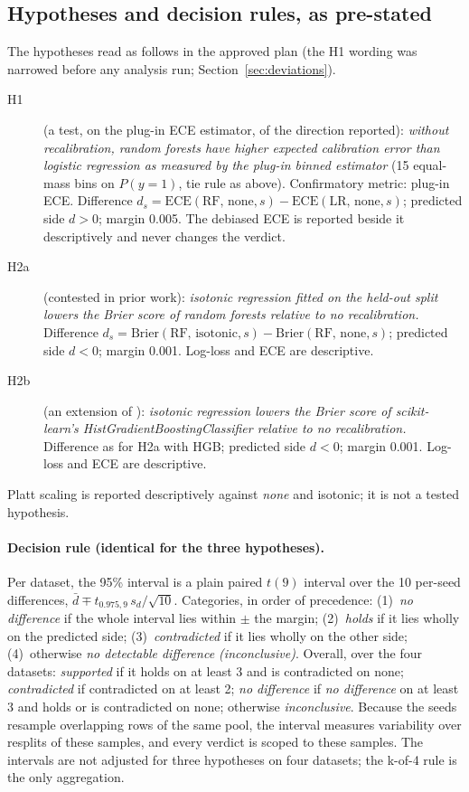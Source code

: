 \documentclass[11pt]{article}
\newcommand{\cat}[1]{\emph{#1}}
\begin{document}
\subsection{Hypotheses and decision rules, as pre-stated}
\label{sec:hyp}

The hypotheses read as follows in the approved plan (the H1 wording was narrowed before any
analysis run; Section~\ref{sec:deviations}).

\begin{description}
  \item[H1] (a test, on the plug-in ECE estimator, of the direction
        \citet{niculescumizil2005} reported): \emph{without recalibration, random forests
        have higher expected calibration error than logistic regression as measured by the
        plug-in binned estimator} (15 equal-mass bins on $P(y=1)$, tie rule as above).
        Confirmatory metric: plug-in ECE. Difference $d_s=\mathrm{ECE}(\text{RF, none},
        s)-\mathrm{ECE}(\text{LR, none}, s)$; predicted side $d>0$; margin 0.005. The debiased
        ECE is reported beside it descriptively and never changes the verdict.
  \item[H2a] (contested in prior work): \emph{isotonic regression fitted on the held-out
        split lowers the Brier score of random forests relative to no recalibration.}
        Difference $d_s=\mathrm{Brier}(\text{RF, isotonic}, s)-\mathrm{Brier}(\text{RF,
        none}, s)$; predicted side $d<0$; margin 0.001. Log-loss and ECE are descriptive.
  \item[H2b] (an extension of \citealp{fonseca2017}): \emph{isotonic regression lowers the
        Brier score of scikit-learn's HistGradientBoostingClassifier relative to no
        recalibration.} Difference as for H2a with HGB; predicted side $d<0$; margin 0.001.
        Log-loss and ECE are descriptive.
\end{description}
Platt scaling is reported descriptively against \emph{none} and isotonic; it is not a tested
hypothesis.

\paragraph{Decision rule (identical for the three hypotheses).} Per dataset, the 95\%
interval is a plain paired $t(9)$ interval over the 10 per-seed differences,
$\bar d \mp t_{0.975,9}\,s_d/\sqrt{10}$. Categories, in order of precedence:
(1)~\cat{no difference} if the whole interval lies within $\pm$ the margin;
(2)~\cat{holds} if it lies wholly on the predicted side;
(3)~\cat{contradicted} if it lies wholly on the other side;
(4)~otherwise \cat{no detectable difference (inconclusive)}.
Overall, over the four datasets: \cat{supported} if it holds on at least 3 and is
contradicted on none; \cat{contradicted} if contradicted on at least 2; \cat{no difference}
if \cat{no difference} on at least 3 and holds or is contradicted on none; otherwise
\cat{inconclusive}. Because the seeds resample overlapping rows of the same pool, the
interval measures variability over resplits of these samples, and every verdict is scoped to
these samples. The intervals are not adjusted for three hypotheses on four datasets; the
k-of-4 rule is the only aggregation.
\end{document}
